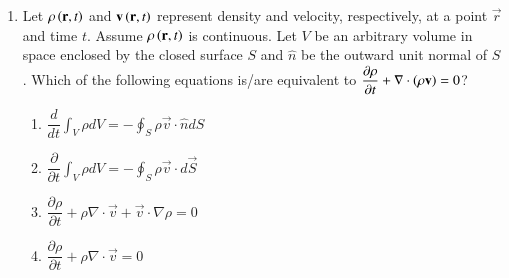 \documentclass[journal,12pt,onecolumn]{IEEEtran}
\theoremstyle{remark}
\begin{document}
\begin{enumerate}
\hfill{}
\begin{multicols}{2}
\begin{enumerate}
    \item The system is stable.
    \item The system is a minimum phase system.
    \item The initial value of the impulse response is 2.
    \item The final value of the impulse response is 0.
\end{enumerate}    
\end{multicols}


\item Let $\rho\left(\mathbf{r},t\right)$ and $\mathbf{v}\left(\mathbf{r},t\right)$ represent density and velocity, respectively, at a point $\vec{r}$ and time $t$. Assume $\rho\left(\mathbf{r},t\right)$ is continuous. Let $V$ be an arbitrary volume in space enclosed by the closed surface $S$ and $\hat{n}$ be the outward unit normal of $S$. Which of the following equations is/are equivalent to $\dfrac{\partial \rho}{\partial t} + \nabla \cdot \left(\rho \mathbf{v}\right) = 0$?

\hfill{}
\begin{multicols}{2}
 \begin{enumerate}
    \item $\dfrac{d}{dt} \int_V \rho dV = - \oint_S \rho \vec{v} \cdot \hat{n} dS$
    \item $\dfrac{\partial}{\partial t} \int_V \rho dV = - \oint_S \rho \vec{v} \cdot d\vec{S}$
    \item $\dfrac{\partial \rho}{\partial t} + \rho \nabla \cdot \vec{v} + \vec{v} \cdot \nabla \rho = 0$
    \item $\dfrac{\partial \rho}{\partial t} + \rho \nabla \cdot \vec{v} = 0$
\end{enumerate}   
\end{multicols}


\end{enumerate}
\end{document}
